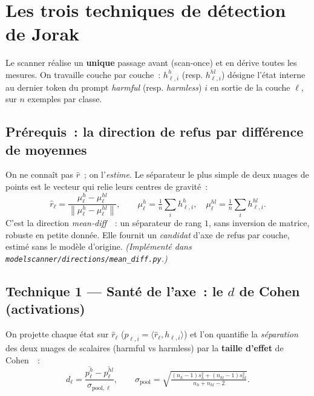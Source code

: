\documentclass[11pt,a4paper]{article}
\theoremstyle{definition}
\theoremstyle{plain}
\newcommand{\rhat}{\hat{r}}
\newcommand{\norm}[1]{\left\lVert #1 \right\rVert}
\newcommand{\inner}[2]{\langle #1, #2 \rangle}
\begin{document}
\section{Les trois techniques de détection de Jorak}\label{sec:outils}
Le scanner réalise un \textbf{unique} passage avant (\og scan-once\fg{}) et en dérive
toutes les mesures. On travaille couche par couche~: $h^{h}_{\ell,i}$ (resp.
$h^{hl}_{\ell,i}$) désigne l'état interne au dernier token du prompt \emph{harmful}
(resp. \emph{harmless}) $i$ en sortie de la couche $\ell$, sur $n$ exemples par classe.

\subsection{Prérequis~: la direction de refus par différence de moyennes}
On ne connaît pas $\rhat$~; on l'\emph{estime}. Le séparateur le plus simple de deux
nuages de points est le vecteur qui relie leurs centres de gravité~:
\begin{equation}\label{eq:meandiff}
  \rhat_\ell=\frac{\mu^{h}_\ell-\mu^{hl}_\ell}{\norm{\mu^{h}_\ell-\mu^{hl}_\ell}},
  \qquad
  \mu^{h}_\ell=\tfrac1n\textstyle\sum_i h^{h}_{\ell,i},\quad
  \mu^{hl}_\ell=\tfrac1n\textstyle\sum_i h^{hl}_{\ell,i}.
\end{equation}
C'est la direction \emph{mean-diff}~\cite{arditi2024}~: un séparateur de rang $1$,
sans inversion de matrice, robuste en petite donnée. Elle fournit un \emph{candidat}
d'axe de refus par couche, estimé sans le modèle d'origine. \emph{(Implémenté dans
\texttt{modelscanner/directions/mean\_diff.py}.)}

\subsection{Technique 1 — Santé de l'axe~: le $d$ de Cohen (activations)}\label{sec:cohen}
On projette chaque état sur $\rhat_\ell$ ($p_{\ell,i}=\inner{\rhat_\ell}{h_{\ell,i}}$)
et l'on quantifie la \emph{séparation} des deux nuages de scalaires (harmful vs
harmless) par la \textbf{taille d'effet} de Cohen~\cite{cohen1988}~:
\begin{equation}\label{eq:cohen}
  d_\ell=\frac{\overline{p^{h}_\ell}-\overline{p^{hl}_\ell}}{\sigma_{\text{pool},\ell}},
  \qquad
  \sigma_{\text{pool}}=\sqrt{\tfrac{(n_h-1)s_h^2+(n_{hl}-1)s_{hl}^2}{n_h+n_{hl}-2}} .
\end{equation}
\end{document}
